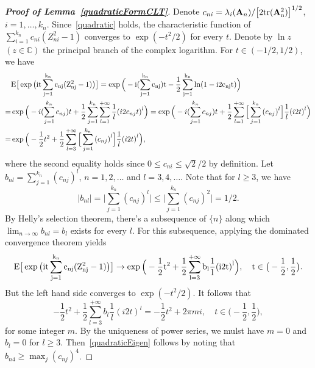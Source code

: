 \documentclass[times,sort&compress,3p]{elsarticle}
\newcommand{\mytr}{\rm tr}
\newcommand{\myE}{\rm E}
\newcommand{\BA}{\mathbf{A}}    \newcommand{\BB}{\mathbf{B}}    \newcommand{\BC}{\mathbf{C}}    \newcommand{\BD}{\mathbf{D}}    \newcommand{\BE}{\mathbf{E}}    \newcommand{\BF}{\mathbf{F}}    \newcommand{\BG}{\mathbf{G}}    \newcommand{\BH}{\mathbf{H}}    \newcommand{\BI}{\mathbf{I}}    \newcommand{\BJ}{\mathbf{J}}    \newcommand{\BK}{\mathbf{K}}    \newcommand{\BL}{\mathbf{L}}
\theoremstyle{plain}
\theoremstyle{definition}
\theoremstyle{remark}
\begin{document}
\begin{appendices}
\begin{proof}[\textbf{Proof of Lemma~\ref{quadraticFormCLT}}]
    Denote $c_{ni}=\lambda_i(\BA_n)/{\big[2\mytr(\BA_n^2)\big]}^{1/2}$, $i=1,\ldots,k_n$.
    Since~\ref{quadratic} holds, the characteristic function of
        $
        \sum_{i=1}^{k_n}c_{ni}(Z_{ni}^2-1)
    $
    converges to $\exp(-t^2/2)$ for every $t$.
    Denote by $\ln z$ $(z\in\mathbb{C})$ the principal branch of the complex logarithm.
    For $t\in (-1/2,1/2)$, we have
    \begin{equation*}
        \begin{aligned}
            &\myE\big[\exp{\big(it \sum_{j=1}^{k_n}c_{nj}(Z_{nj}^2-1)\big)}\big]
            =
            \exp\Big(-i(\sum_{j=1}^{k_n}c_{nj})t-
            \frac{1}{2}\sum_{j=1}^{k_n}\ln(1-i2c_{nj}t) \Big)\\
            =&
            \exp\Big(
            -i(\sum_{j=1}^{k_n}c_{nj})t+
            \frac{1}{2}\sum_{j=1}^{k_n}\sum_{l=1}^{+\infty}\frac{1}{l}{(i2c_{nj}t)}^l
            \Big)
            =
            \exp\Big(
            -i(\sum_{j=1}^{k_n}c_{nj})t+
            \frac{1}{2}\sum_{l=1}^{+\infty}\Big[\sum_{j=1}^{k_n}{(c_{nj})}^l\Big]\frac{1}{l}{(i2t)}^l\Big)\\
            =&
            \exp\Big(
            -\frac{1}{2}t^2+
            \frac{1}{2}\sum_{l=3}^{+\infty}\Big[\sum_{j=1}^{k_n}{(c_{nj})}^l\Big]\frac{1}{l}{(i2t)}^l \Big),
        \end{aligned}
    \end{equation*}
    where the second equality holds since $0\leq c_{ni}\leq \sqrt{2}/2$ by definition.
    Let $b_{nl}=\sum_{j=1}^{k_n}{(c_{nj})}^l$, $n=1,2,\ldots$ and $l=3,4,\ldots$.
    Note that for $l\geq 3$, we have
    $$|b_{nl}|=\big|\sum_{j=1}^{k_n}{(c_{nj})}^l\big|\leq \big|\sum_{j=1}^{k_n}{(c_{nj})}^2\big|=1/2.$$
    By Helly's selection theorem, there's a subsequence of $\{n\}$ along which $\lim_{n\to \infty}b_{nl}=b_l$ exists for every $l$.
    For this subsequence, applying the dominated convergence theorem yields
            $$\myE \big[\exp{\big(it \sum_{j=1}^{k_n}c_{nj}(Z_{nj}^2-1)\big)}\big]
            \to
            \exp\Big(
            -\frac{1}{2}t^2+
            \frac{1}{2}\sum_{l=3}^{+\infty}b_l\frac{1}{l}{(i2t)}^l\Big),
            \quad t\in\big(-\frac{1}{2},\frac{1}{2}\big).
            $$
            But the left hand side converges to $\exp(-t^2/2)$.
            It follows that
            $$
            -\frac{1}{2}t^2+
            \frac{1}{2}\sum_{l=3}^{+\infty}b_l\frac{1}{l}{(i2t)}^l
            =-\frac{1}{2}t^2+ 2\pi m i,
            \quad t\in\big(-\frac{1}{2},\frac{1}{2}\big),
            $$
            for some integer $m$.
            By the uniqueness of power series, we mulst have $m=0$ and $b_l=0$ for $l\geq 3$. Then~\ref{quadraticEigen} follows by noting that $b_{n4}\geq \max_j{(c_{nj})}^4$.
\end{proof}






\end{appendices}
\end{document}
